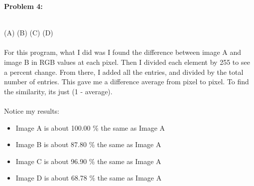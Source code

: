\documentclass[11pt]{article}
\newenvironment{problem}[1]{\textbf{Problem #1: }}{\newpage}
\begin{document}
\begin{problem}{4}
\begin{figure}[h!]
		\end{figure}
		\\ 
		\text{} \hspace{1.5cm} (A) \hspace{3.25cm} (B) \hspace{3.5cm} (C) \hspace{3.25cm} (D)
		\\ \\
		For this program, what I did was I found the difference between image A and image B in RGB values at each pixel.  Then I divided each element by 255 to see a percent change.  From there, I added all the entries, and divided by the total number of entries. This gave me a difference average from pixel to pixel.  To find the similarity, its just (1 - average).
		\\ \\
		Notice my results:
		\begin{itemize}[label = -]
			\item Image A is about 100.00 \% the same as Image A 
			\item Image B is about 87.80 \% the same as Image A 
			\item Image C is about 96.90 \% the same as Image A 
			\item Image D is about 68.78 \% the same as Image A 
		\end{itemize}
		
		
	\end{problem}
\end{document}
